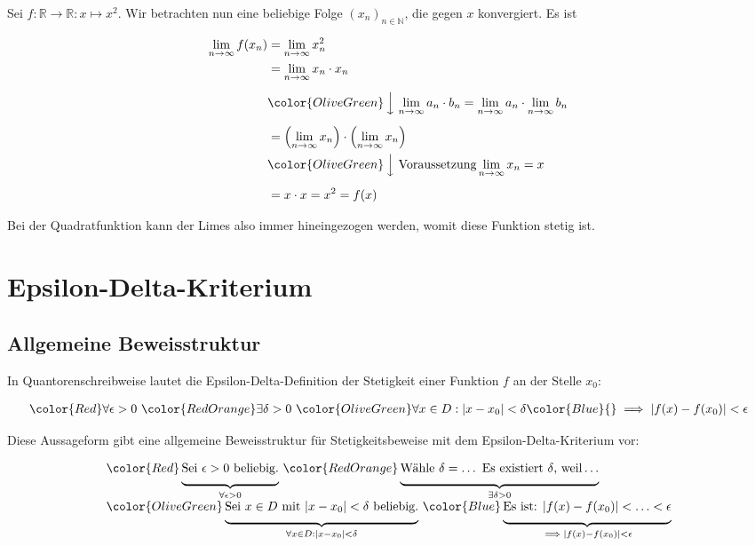 \documentclass[fontsize=9pt,
               parskip=half-,
               DIV=14,
               listof=chapterentry,
               tocflat]{scrbook}
\begin{document}
\begin{proof*}
Sei $f:\mathbb {R} \to \mathbb {R} :x\mapsto x^{2}$. Wir betrachten nun eine beliebige Folge $(x_{n})_{n\in \mathbb {N} }$, die gegen $x$ konvergiert. Es ist

\begin{align*}
\lim _{n\to \infty }f(x_{n})&=\lim _{n\to \infty }x_{n}^{2}\\&=\lim _{n\to \infty }x_{n}\cdot x_{n}\\[0.5em]&{\color {OliveGreen}\left\downarrow \ \lim _{n\to \infty }a_{n}\cdot b_{n}=\lim _{n\to \infty }a_{n}\cdot \lim _{n\to \infty }b_{n}\right.}\\[0.5em]&=\left(\lim _{n\to \infty }x_{n}\right)\cdot \left(\lim _{n\to \infty }x_{n}\right)\\&{\color {OliveGreen}\left\downarrow \ {\text{Voraussetzung}}\lim _{n\to \infty }x_{n}=x\right.}\\[0.5em]&=x\cdot x=x^{2}=f(x)
\end{align*}

Bei der Quadratfunktion kann der Limes also immer hineingezogen werden, womit diese Funktion stetig ist.

\end{proof*}

\section{Epsilon-Delta-Kriterium}

\subsection{Allgemeine Beweisstruktur}

In Quantorenschreibweise lautet die Epsilon-Delta-Definition der Stetigkeit einer Funktion $f$ an der Stelle $x_{0}$:

\begin{align*}
{\color {Red}\forall \epsilon >0}\ {\color {RedOrange}\exists \delta >0}\ {\color {OliveGreen}\forall x\in D:|x-x_{0}|<\delta }{\color {Blue}{}\implies |f(x)-f(x_{0})|<\epsilon }
\end{align*}

Diese Aussageform gibt eine allgemeine Beweisstruktur für Stetigkeitsbeweise mit dem Epsilon-Delta-Kriterium vor:

\begin{align*}
{\begin{array}{l}{\color {Red}\underbrace {{\underset {}{}}{\text{Sei }}\epsilon >0{\text{ beliebig.}}} _{\forall \epsilon >0}}\ {\color {RedOrange}\underbrace {{\underset {}{}}{\text{Wähle }}\delta =\ldots {\text{ Es existiert }}\delta {\text{, weil}}\ldots } _{\exists \delta >0}}\\{\color {OliveGreen}\underbrace {{\underset {}{}}{\text{Sei }}x\in D{\text{ mit }}|x-x_{0}|<\delta {\text{ beliebig.}}} _{\forall x\in D:|x-x_{0}|<\delta }}\ {\color {Blue}\underbrace {{\underset {}{}}{\text{Es ist: }}|f(x)-f(x_{0})|<\ldots <\epsilon } _{{}\implies |f(x)-f(x_{0})|<\epsilon }}\end{array}}
\end{align*}
\end{document}
